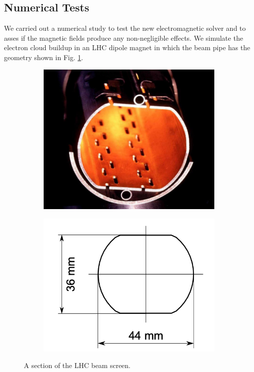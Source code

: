 \subsection{Numerical Tests}
We carried out a numerical study to test the new electromagnetic solver and to asses if the magnetic fields produce any non-negligible effects. We simulate the electron cloud buildup in an LHC dipole magnet in which the beam pipe has the geometry shown in Fig. \ref{fig:LHCbeamscreen}.
\begin{figure}
    \centering
    \begin{subfigure}{0.45\textwidth}
        \includegraphics[width=\textwidth]{chapters/Chapter1/Figures/LHC_beam_screen.png}
    \end{subfigure}
    \begin{subfigure}{0.45\textwidth}
        \includegraphics[width=\textwidth]{chapters/Chapter1/Figures/LHC_beam_screen_scheme.png}
    \end{subfigure}
    \caption{A section of the LHC beam screen.\cite{Iadarola:thesis}}
    \label{fig:LHCbeamscreen}
\end{figure}
